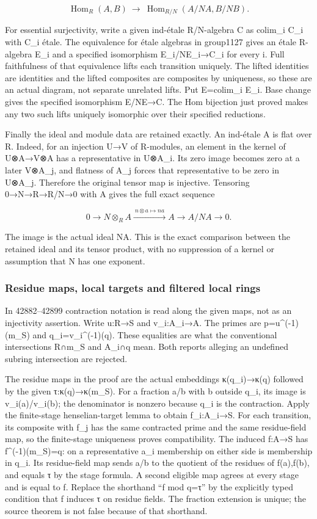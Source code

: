 \[
\operatorname{Hom}_R(A,B)
 \ \longrightarrow\
\operatorname{Hom}_{R/N}(A/NA,B/NB).
\]

For essential surjectivity, write a given ind-étale R/N-algebra C as colim\_i C\_i with C\_i étale. The equivalence for étale algebras in group1127 gives an étale R-algebra E\_i and a specified isomorphism E\_i/NE\_i→C\_i for every i. Full faithfulness of that equivalence lifts each transition uniquely. The lifted identities are identities and the lifted composites are composites by uniqueness, so these are an actual diagram, not separate unrelated lifts. Put E=colim\_i E\_i. Base change gives the specified isomorphism E/NE→C. The Hom bijection just proved makes any two such lifts uniquely isomorphic over their specified reductions.

Finally the ideal and module data are retained exactly. An ind-étale A is flat over R. Indeed, for an injection U→V of R-modules, an element in the kernel of U⊗A→V⊗A has a representative in U⊗A\_i. Its zero image becomes zero at a later V⊗A\_j, and flatness of A\_j forces that representative to be zero in U⊗A\_j. Therefore the original tensor map is injective. Tensoring 0→N→R→R/N→0 with A gives the full exact sequence

\[
0\longrightarrow N\otimes_R A
 \xrightarrow{\ n\otimes a\mapsto na\ } A
 \longrightarrow A/NA\longrightarrow0.
\]

The image is the actual ideal NA. This is the exact comparison between the retained ideal and its tensor product, with no suppression of a kernel or assumption that N has one exponent.

\subsubsection{Residue maps, local targets and filtered local rings}\label{algebra-proof-059-residue-maps-local-targets-and-filtered-local-rings}

In 42882--42899 contraction notation is read along the given maps, not as an injectivity assertion. Write u:R→S and v\_i:A\_i→A. The primes are p=u\^{}(-1)(m\_S) and q\_i=v\_i\^{}(-1)(q). These equalities are what the conventional intersections R∩m\_S and A\_i∩q mean. Both reports alleging an undefined subring intersection are rejected.

The residue maps in the proof are the actual embeddings κ(q\_i)→κ(q) followed by the given τ:κ(q)→κ(m\_S). For a fraction a/b with b outside q\_i, its image is v\_i(a)/v\_i(b); the denominator is nonzero because q\_i is the contraction. Apply the finite-stage henselian-target lemma to obtain f\_i:A\_i→S. For each transition, its composite with f\_j has the same contracted prime and the same residue-field map, so the finite-stage uniqueness proves compatibility. The induced f:A→S has f\^{}(-1)(m\_S)=q: on a representative a\_i membership on either side is membership in q\_i. Its residue-field map sends a/b to the quotient of the residues of f(a),f(b), and equals τ by the stage formula. A second eligible map agrees at every stage and is equal to f. Replace the shorthand ``f mod q=τ'' by the explicitly typed condition that f induces τ on residue fields. The fraction extension is unique; the source theorem is not false because of that shorthand.

